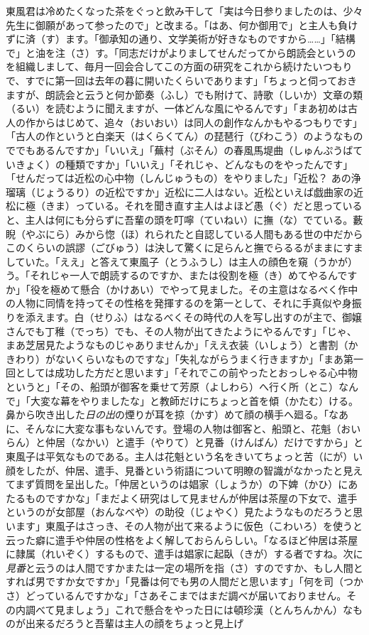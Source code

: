 \documentclass{book}
\begin{document}
東風君は冷めたくなった茶をぐっと飲み干して「実は今日参りましたのは、少々先生に御願があって参ったので」と改まる。「はあ、何か御用で」と主人も負けずに済（す）ます。「御承知の通り、文学美術が好きなものですから\ldots{}\ldots{}」「結構で」と油を注（さ）す。「同志だけがよりましてせんだってから朗読会というのを組織しまして、毎月一回会合してこの方面の研究をこれから続けたいつもりで、すでに第一回は去年の暮に開いたくらいであります」「ちょっと伺っておきますが、朗読会と云うと何か節奏（ふし）でも附けて、詩歌（しいか）文章の類（るい）を読むように聞えますが、一体どんな風にやるんです」「まあ初めは古人の作からはじめて、追々（おいおい）は同人の創作なんかもやるつもりです」「古人の作というと白楽天（はくらくてん）の琵琶行（びわこう）のようなものででもあるんですか」「いいえ」「蕪村（ぶそん）の春風馬堤曲（しゅんぷうばていきょく）の種類ですか」「いいえ」「それじゃ、どんなものをやったんです」「せんだっては近松の心中物（しんじゅうもの）をやりました」「近松？ あの浄瑠璃（じょうるり）の近松ですか」近松に二人はない。近松といえば戯曲家の近松に極（きま）っている。それを聞き直す主人はよほど愚（ぐ）だと思っていると、主人は何にも分らずに吾輩の頭を叮嚀（ていねい）に撫（な）でている。藪睨（やぶにら）みから惚（ほ）れられたと自認している人間もある世の中だからこのくらいの誤謬（ごびゅう）は決して驚くに足らんと撫でらるるがままにすましていた。「ええ」と答えて東風子（とうふうし）は主人の顔色を窺（うかが）う。「それじゃ一人で朗読するのですか、または役割を極（き）めてやるんですか」「役を極めて懸合（かけあい）でやって見ました。その主意はなるべく作中の人物に同情を持ってその性格を発揮するのを第一として、それに手真似や身振りを添えます。白（せりふ）はなるべくその時代の人を写し出すのが主で、御嬢さんでも丁稚（でっち）でも、その人物が出てきたようにやるんです」「じゃ、まあ芝居見たようなものじゃありませんか」「ええ衣装（いしょう）と書割（かきわり）がないくらいなものですな」「失礼ながらうまく行きますか」「まあ第一回としては成功した方だと思います」「それでこの前やったとおっしゃる心中物というと」「その、船頭が御客を乗せて芳原（よしわら）へ行く所（とこ）なんで」「大変な幕をやりましたな」と教師だけにちょっと首を傾（かたむ）ける。鼻から吹き出した\emph{日の出}の煙りが耳を掠（かす）めて顔の横手へ廻る。「なあに、そんなに大変な事もないんです。登場の人物は御客と、船頭と、花魁（おいらん）と仲居（なかい）と遣手（やりて）と見番（けんばん）だけですから」と東風子は平気なものである。主人は花魁という名をきいてちょっと苦（にが）い顔をしたが、仲居、遣手、見番という術語について明瞭の智識がなかったと見えてまず質問を呈出した。「仲居というのは娼家（しょうか）の下婢（かひ）にあたるものですかな」「まだよく研究はして見ませんが仲居は茶屋の下女で、遣手というのが女部屋（おんなべや）の助役（じょやく）見たようなものだろうと思います」東風子はさっき、その人物が出て来るように仮色（こわいろ）を使うと云った癖に遣手や仲居の性格をよく解しておらんらしい。「なるほど仲居は茶屋に隷属（れいぞく）するもので、遣手は娼家に起臥（きが）する者ですね。次に\emph{見番}と云うのは人間ですかまたは一定の場所を指（さ）すのですか、もし人間とすれば男ですか女ですか」「見番は何でも男の人間だと思います」「何を司（つかさ）どっているんですかな」「さあそこまではまだ調べが届いておりません。その内調べて見ましょう」これで懸合をやった日には頓珍漢（とんちんかん）なものが出来るだろうと吾輩は主人の顔をちょっと見上げ
\end{document}
